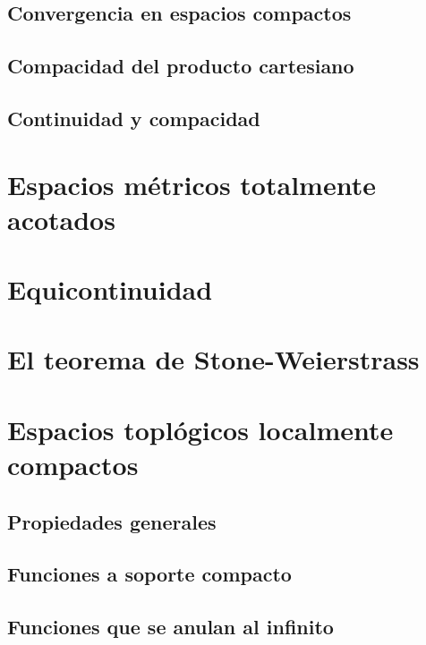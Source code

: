 \documentclass[12pt,]{krantz}
\theoremstyle{definition}
\theoremstyle{definition}
\theoremstyle{definition}
\theoremstyle{remark}
\begin{document}
\section{Convergencia en espacios
compactos}\label{convergencia-en-espacios-compactos}

\section{Compacidad del producto
cartesiano}\label{compacidad-del-producto-cartesiano}

\section{Continuidad y compacidad}\label{continuidad-y-compacidad}

\chapter{Espacios métricos totalmente
acotados}\label{espacios-metricos-totalmente-acotados}

\chapter{Equicontinuidad}\label{equicontinuidad}

\chapter{El teorema de
Stone-Weierstrass}\label{el-teorema-de-stone-weierstrass}

\chapter{Espacios toplógicos localmente
compactos}\label{espacios-toplogicos-localmente-compactos}

\section{Propiedades generales}\label{propiedades-generales-1}

\section{Funciones a soporte
compacto}\label{funciones-a-soporte-compacto}

\section{Funciones que se anulan al
infinito}\label{funciones-que-se-anulan-al-infinito}
\end{document}
